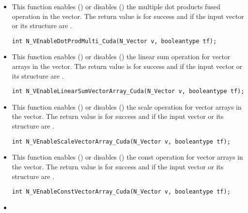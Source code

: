 \begin{itemize}

\item {}

This function enables () or disables () the multiple
dot products fused operation in the {\cuda} vector. The return value is 
for success and  if the input vector or its  structure are
.

\verb|int N_VEnableDotProdMulti_Cuda(N_Vector v, booleantype tf);|


\item {}

This function enables () or disables () the linear sum
operation for vector arrays in the {\cuda} vector. The return value is  for
success and  if the input vector or its  structure are .

\verb|int N_VEnableLinearSumVectorArray_Cuda(N_Vector v, booleantype tf);|


\item {}

This function enables () or disables () the scale
operation for vector arrays in the {\cuda} vector. The return value is  for
success and  if the input vector or its  structure are .

\verb|int N_VEnableScaleVectorArray_Cuda(N_Vector v, booleantype tf);|


\item {}

This function enables () or disables () the const
operation for vector arrays in the {\cuda} vector. The return value is  for
success and  if the input vector or its  structure are .

\verb|int N_VEnableConstVectorArray_Cuda(N_Vector v, booleantype tf);|


\item {}


\end{itemize}

